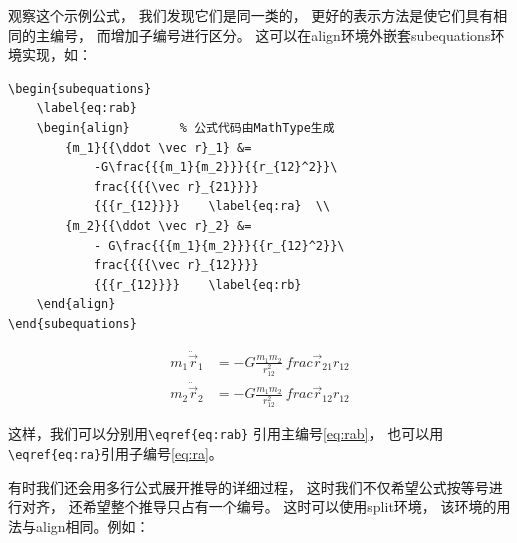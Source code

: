 \documentclass{ctexart}
\numberwithin{equation}{section}			%
\begin{document}
	观察这个示例公式，
	我们发现它们是同一类的，
	更好的表示方法是使它们具有相同的主编号，
	而增加子编号进行区分。
	这可以在align环境外嵌套subequations环境实现，如：
	
\begin{lstlisting}
\begin{subequations}
	\label{eq:rab}
	\begin{align}		% 公式代码由MathType生成
		{m_1}{{\ddot \vec r}_1} &=  
			-G\frac{{{m_1}{m_2}}}{{r_{12}^2}}\
			frac{{{{\vec r}_{21}}}}
			{{{r_{12}}}} 	\label{eq:ra}  \\
		{m_2}{{\ddot \vec r}_2} &=  
			- G\frac{{{m_1}{m_2}}}{{r_{12}^2}}\
			frac{{{{\vec r}_{12}}}}
			{{{r_{12}}}} 	\label{eq:rb}
	\end{align} 
\end{subequations}
\end{lstlisting}
	\begin{subequations}
		\label{eq:rab}
		\begin{align}		%
			{m_1}{{\ddot \vec r}_1} &=  
				-G\frac{{{m_1}{m_2}}}{{r_{12}^2}}\
				frac{{{{\vec r}_{21}}}}
				{{{r_{12}}}} 	\label{eq:ra}  \\
			{m_2}{{\ddot \vec r}_2} &=  
				- G\frac{{{m_1}{m_2}}}{{r_{12}^2}}\
				frac{{{{\vec r}_{12}}}}
				{{{r_{12}}}} 	\label{eq:rb}
		\end{align} 
	\end{subequations}

	这样，我们可以分别用\verb|\eqref{eq:rab}|
	引用主编号\eqref{eq:rab}，
	也可以用\verb|\eqref{eq:ra}|引用子编号\eqref{eq:ra}。
	
	有时我们还会用多行公式展开推导的详细过程，
	这时我们不仅希望公式按等号进行对齐，
	还希望整个推导只占有一个编号。
	这时可以使用split环境，
	该环境的用法与align相同。例如：
	
\end{document}
